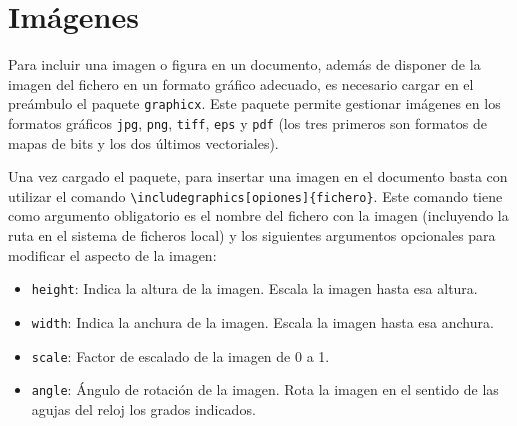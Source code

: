 \documentclass[
  spanish,
  a4paper,
]{scrreport}
\providecommand{\tightlist}{%
  \setlength{\itemsep}{0pt}\setlength{\parskip}{0pt}}
\theoremstyle{definition}
\theoremstyle{remark}
\begin{document}

\chapter{Imágenes}\label{imuxe1genes}

Para incluir una imagen o figura en un documento, además de disponer de
la imagen del fichero en un formato gráfico adecuado, es necesario
cargar en el preámbulo el paquete \texttt{graphicx}. Este paquete
permite gestionar imágenes en los formatos gráficos \texttt{jpg},
\texttt{png}, \texttt{tiff}, \texttt{eps} y \texttt{pdf} (los tres
primeros son formatos de mapas de bits y los dos últimos vectoriales).

Una vez cargado el paquete, para insertar una imagen en el documento
basta con utilizar el comando
\texttt{\textbackslash{}includegraphics{[}opiones{]}\{fichero\}}. Este
comando tiene como argumento obligatorio es el nombre del fichero con la
imagen (incluyendo la ruta en el sistema de ficheros local) y los
siguientes argumentos opcionales para modificar el aspecto de la imagen:

\begin{itemize}
\tightlist
\item
  \texttt{height}: Indica la altura de la imagen. Escala la imagen hasta
  esa altura.
\item
  \texttt{width}: Indica la anchura de la imagen. Escala la imagen hasta
  esa anchura.
\item
  \texttt{scale}: Factor de escalado de la imagen de 0 a 1.
\item
  \texttt{angle}: Ángulo de rotación de la imagen. Rota la imagen en el
  sentido de las agujas del reloj los grados indicados.
\end{itemize}
\end{document}
